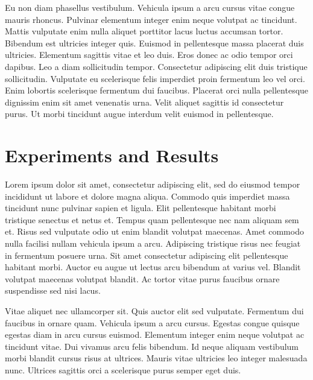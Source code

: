\documentclass[conference]{IEEEtran}
\begin{document}
Eu non diam phasellus vestibulum. Vehicula ipsum a arcu cursus vitae congue mauris rhoncus. Pulvinar elementum integer enim neque volutpat ac tincidunt. Mattis vulputate enim nulla aliquet porttitor lacus luctus accumsan tortor. Bibendum est ultricies integer quis. Euismod in pellentesque massa placerat duis ultricies. Elementum sagittis vitae et leo duis. Eros donec ac odio tempor orci dapibus. Leo a diam sollicitudin tempor. Consectetur adipiscing elit duis tristique sollicitudin. Vulputate eu scelerisque felis imperdiet proin fermentum leo vel orci. Enim lobortis scelerisque fermentum dui faucibus. Placerat orci nulla pellentesque dignissim enim sit amet venenatis urna. Velit aliquet sagittis id consectetur purus. Ut morbi tincidunt augue interdum velit euismod in pellentesque.

\section{Experiments and Results}
Lorem ipsum dolor sit amet, consectetur adipiscing elit, sed do eiusmod tempor incididunt ut labore et dolore magna aliqua. Commodo quis imperdiet massa tincidunt nunc pulvinar sapien et ligula. Elit pellentesque habitant morbi tristique senectus et netus et. Tempus quam pellentesque nec nam aliquam sem et. Risus sed vulputate odio ut enim blandit volutpat maecenas. Amet commodo nulla facilisi nullam vehicula ipsum a arcu. Adipiscing tristique risus nec feugiat in fermentum posuere urna. Sit amet consectetur adipiscing elit pellentesque habitant morbi. Auctor eu augue ut lectus arcu bibendum at varius vel. Blandit volutpat maecenas volutpat blandit. Ac tortor vitae purus faucibus ornare suspendisse sed nisi lacus.

Vitae aliquet nec ullamcorper sit. Quis auctor elit sed vulputate. Fermentum dui faucibus in ornare quam. Vehicula ipsum a arcu cursus. Egestas congue quisque egestas diam in arcu cursus euismod. Elementum integer enim neque volutpat ac tincidunt vitae. Dui vivamus arcu felis bibendum. Id neque aliquam vestibulum morbi blandit cursus risus at ultrices. Mauris vitae ultricies leo integer malesuada nunc. Ultrices sagittis orci a scelerisque purus semper eget duis.
\end{document}
